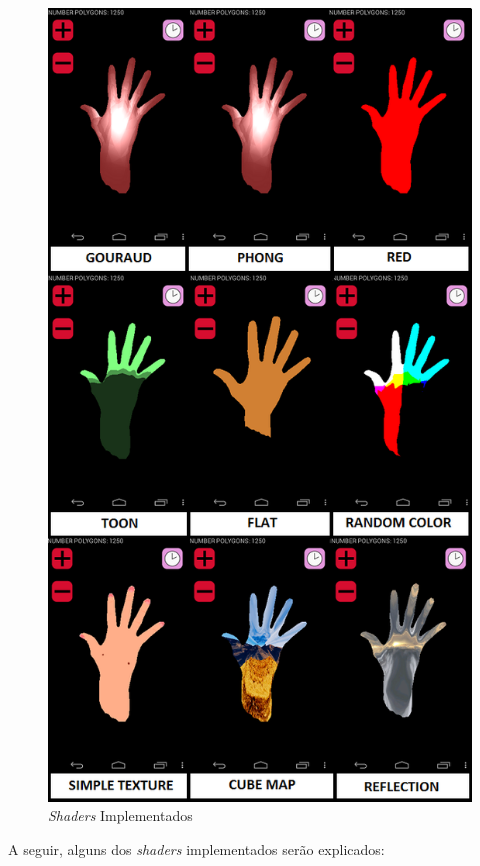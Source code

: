 	\begin{figure}[h]
	\centering
		\includegraphics[keepaspectratio=true,scale=0.7]{figuras/shaders_impl.png}
	\caption{\textit{Shaders} Implementados}
	\label{shaders_impl}
	\end{figure}

	A seguir, alguns dos \textit{shaders} implementados serão explicados:

